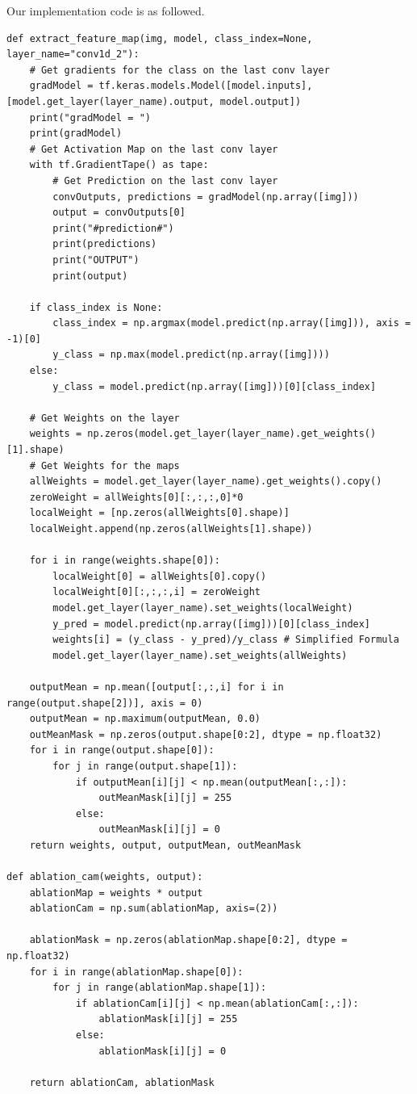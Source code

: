 \documentclass[conference]{IEEEtran}
\begin{document}
Our implementation code is as followed.

\begin{lstlisting}
def extract_feature_map(img, model, class_index=None, layer_name="conv1d_2"):
    # Get gradients for the class on the last conv layer
    gradModel = tf.keras.models.Model([model.inputs],[model.get_layer(layer_name).output, model.output])
    print("gradModel = ")
    print(gradModel)
    # Get Activation Map on the last conv layer
    with tf.GradientTape() as tape:
        # Get Prediction on the last conv layer
        convOutputs, predictions = gradModel(np.array([img]))
        output = convOutputs[0]
        print("#prediction#")
        print(predictions)
        print("OUTPUT")
        print(output)
    
    if class_index is None:
        class_index = np.argmax(model.predict(np.array([img])), axis = -1)[0]
        y_class = np.max(model.predict(np.array([img])))
    else:
        y_class = model.predict(np.array([img]))[0][class_index]

    # Get Weights on the layer
    weights = np.zeros(model.get_layer(layer_name).get_weights()[1].shape)
    # Get Weights for the maps
    allWeights = model.get_layer(layer_name).get_weights().copy()
    zeroWeight = allWeights[0][:,:,:,0]*0
    localWeight = [np.zeros(allWeights[0].shape)]
    localWeight.append(np.zeros(allWeights[1].shape))

    for i in range(weights.shape[0]):
        localWeight[0] = allWeights[0].copy()
        localWeight[0][:,:,:,i] = zeroWeight
        model.get_layer(layer_name).set_weights(localWeight)
        y_pred = model.predict(np.array([img]))[0][class_index]
        weights[i] = (y_class - y_pred)/y_class # Simplified Formula
        model.get_layer(layer_name).set_weights(allWeights)

    outputMean = np.mean([output[:,:,i] for i in range(output.shape[2])], axis = 0)
    outputMean = np.maximum(outputMean, 0.0)
    outMeanMask = np.zeros(output.shape[0:2], dtype = np.float32)
    for i in range(output.shape[0]):
        for j in range(output.shape[1]):
            if outputMean[i][j] < np.mean(outputMean[:,:]):
                outMeanMask[i][j] = 255
            else:
                outMeanMask[i][j] = 0
    return weights, output, outputMean, outMeanMask

def ablation_cam(weights, output):
    ablationMap = weights * output
    ablationCam = np.sum(ablationMap, axis=(2))

    ablationMask = np.zeros(ablationMap.shape[0:2], dtype = np.float32)
    for i in range(ablationMap.shape[0]):
        for j in range(ablationMap.shape[1]):
            if ablationCam[i][j] < np.mean(ablationCam[:,:]):
                ablationMask[i][j] = 255
            else:
                ablationMask[i][j] = 0
    
    return ablationCam, ablationMask
\end{lstlisting}
\end{document}

